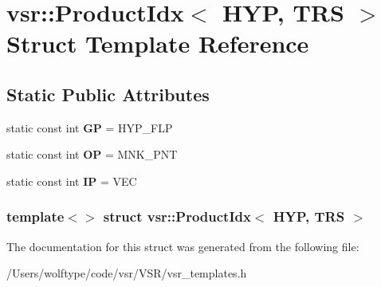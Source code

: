 \hypertarget{structvsr_1_1_product_idx_3_01_h_y_p_00_01_t_r_s_01_4}{\section{vsr\-:\-:Product\-Idx$<$ H\-Y\-P, T\-R\-S $>$ Struct Template Reference}
\label{structvsr_1_1_product_idx_3_01_h_y_p_00_01_t_r_s_01_4}
}
\subsection*{Static Public Attributes}
\begin{DoxyCompactItemize}
\item 
\hypertarget{structvsr_1_1_product_idx_3_01_h_y_p_00_01_t_r_s_01_4_a48d2e6f119c1c8623c1269e4c97b8c35}{static const int {\bfseries G\-P} = H\-Y\-P\-\_\-\-F\-L\-P}\label{structvsr_1_1_product_idx_3_01_h_y_p_00_01_t_r_s_01_4_a48d2e6f119c1c8623c1269e4c97b8c35}

\item 
\hypertarget{structvsr_1_1_product_idx_3_01_h_y_p_00_01_t_r_s_01_4_a3710958a731ffa6b36ebb45021ab144c}{static const int {\bfseries O\-P} = M\-N\-K\-\_\-\-P\-N\-T}\label{structvsr_1_1_product_idx_3_01_h_y_p_00_01_t_r_s_01_4_a3710958a731ffa6b36ebb45021ab144c}

\item 
\hypertarget{structvsr_1_1_product_idx_3_01_h_y_p_00_01_t_r_s_01_4_a6a91b9beaebeebe153228c118ff32da0}{static const int {\bfseries I\-P} = V\-E\-C}\label{structvsr_1_1_product_idx_3_01_h_y_p_00_01_t_r_s_01_4_a6a91b9beaebeebe153228c118ff32da0}

\end{DoxyCompactItemize}
\subsubsection*{template$<$$>$ struct vsr\-::\-Product\-Idx$<$ H\-Y\-P, T\-R\-S $>$}



The documentation for this struct was generated from the following file\-:\begin{DoxyCompactItemize}
\item 
/\-Users/wolftype/code/vsr/\-V\-S\-R/vsr\-\_\-templates.\-h\end{DoxyCompactItemize}
